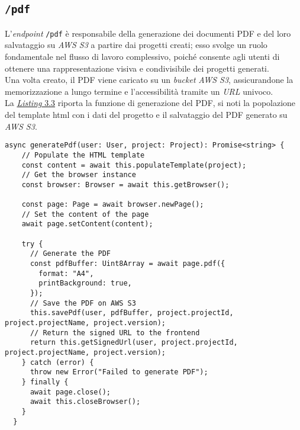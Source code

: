 \subsection*{\texttt{/pdf}}
L’\textit{endpoint} \texttt{/pdf} è responsabile della generazione dei documenti PDF e del loro salvataggio su \textit{AWS S3} a partire dai progetti creati; esso svolge un ruolo fondamentale nel flusso di lavoro complessivo, poiché consente agli utenti di ottenere una rappresentazione visiva e condivisibile dei progetti generati.\\
Una volta creato, il PDF viene caricato su un \textit{bucket} \textit{AWS S3}, assicurandone la memorizzazione a lungo termine e l’accessibilità tramite un \textit{URL} univoco.\\ 

\noindent La {\hyperref[lst:funzione-generazione-pdf]{\textit{Listing} 3.3}} riporta la funzione di generazione del PDF, si noti la popolazione del template \gls{html} con i dati del progetto e il salvataggio del PDF generato su \textit{AWS S3}.
\begin{lstlisting}[caption={Funzione di generazione del PDF, con salvataggio su \textit{AWS S3}}, label={lst:funzione-generazione-pdf}]
async generatePdf(user: User, project: Project): Promise<string> {
    // Populate the HTML template    
    const content = await this.populateTemplate(project);  
    // Get the browser instance
    const browser: Browser = await this.getBrowser(); 

    const page: Page = await browser.newPage();
    // Set the content of the page
    await page.setContent(content); 

    try {
      // Generate the PDF
      const pdfBuffer: Uint8Array = await page.pdf({
        format: "A4",
        printBackground: true,
      }); 
      // Save the PDF on AWS S3
      this.savePdf(user, pdfBuffer, project.projectId, project.projectName, project.version);  
      // Return the signed URL to the frontend
      return this.getSignedUrl(user, project.projectId, project.projectName, project.version);
    } catch (error) {
      throw new Error("Failed to generate PDF");
    } finally {
      await page.close();
      await this.closeBrowser();
    }
  }
\end{lstlisting}